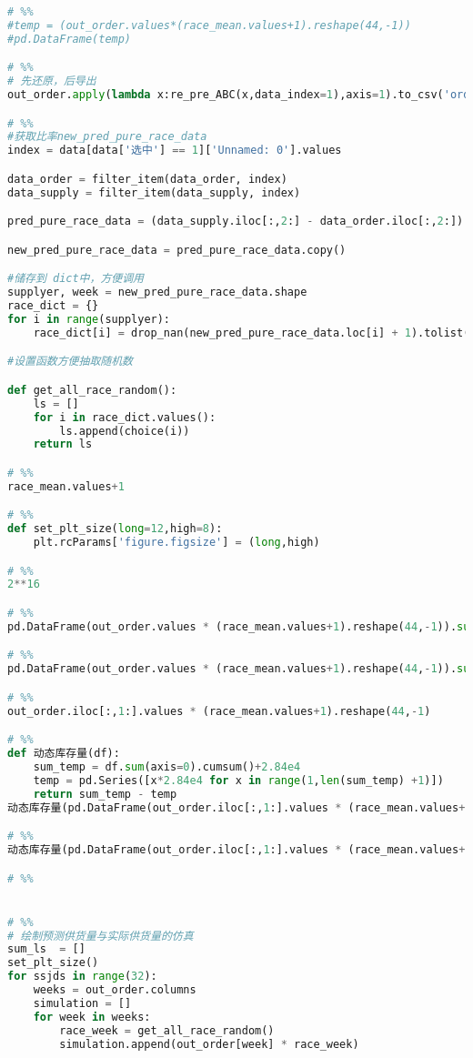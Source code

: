 \begin{appendices}
\begin{lstlisting}[language=python]
# %%
#temp = (out_order.values*(race_mean.values+1).reshape(44,-1))
#pd.DataFrame(temp)

# %%
# 先还原，后导出
out_order.apply(lambda x:re_pre_ABC(x,data_index=1),axis=1).to_csv('order_24_week.csv')

# %%
#获取比率new_pred_pure_race_data
index = data[data['选中'] == 1]['Unnamed: 0'].values

data_order = filter_item(data_order, index)
data_supply = filter_item(data_supply, index)

pred_pure_race_data = (data_supply.iloc[:,2:] - data_order.iloc[:,2:]) / data_order.iloc[:,2:]

new_pred_pure_race_data = pred_pure_race_data.copy()

#储存到 dict中，方便调用
supplyer, week = new_pred_pure_race_data.shape
race_dict = {}
for i in range(supplyer):
    race_dict[i] = drop_nan(new_pred_pure_race_data.loc[i] + 1).tolist()

#设置函数方便抽取随机数

def get_all_race_random():
    ls = []
    for i in race_dict.values():
        ls.append(choice(i))
    return ls

# %%
race_mean.values+1

# %%
def set_plt_size(long=12,high=8):
    plt.rcParams['figure.figsize'] = (long,high)

# %%
2**16

# %%
pd.DataFrame(out_order.values * (race_mean.values+1).reshape(44,-1)).sum(axis=0).cumsum() + 2.84e4 - pd.Series([x*2.84e4 for x in range(1,24+1)])

# %%
pd.DataFrame(out_order.values * (race_mean.values+1).reshape(44,-1)).sum(axis=0).cumsum() + 2.84e4

# %%
out_order.iloc[:,1:].values * (race_mean.values+1).reshape(44,-1)

# %%
def 动态库存量(df):
    sum_temp = df.sum(axis=0).cumsum()+2.84e4
    temp = pd.Series([x*2.84e4 for x in range(1,len(sum_temp) +1)])
    return sum_temp - temp
动态库存量(pd.DataFrame(out_order.iloc[:,1:].values * (race_mean.values+1).reshape(44,-1)))

# %%
动态库存量(pd.DataFrame(out_order.iloc[:,1:].values * (race_mean.values+1).reshape(44,-1))).values

# %%


# %%
# 绘制预测供货量与实际供货量的仿真
sum_ls  = []
set_plt_size()
for ssjds in range(32):
    weeks = out_order.columns
    simulation = []
    for week in weeks:
        race_week = get_all_race_random()
        simulation.append(out_order[week] * race_week)


\end{lstlisting}
\end{appendices}
